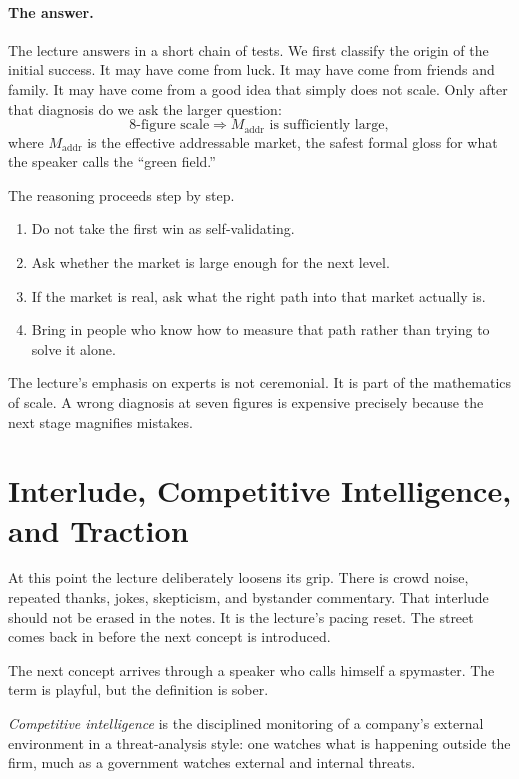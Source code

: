 \paragraph{The answer.}
The lecture answers in a short chain of tests. We first classify the origin of the initial success. It may have come from luck. It may have come from friends and family. It may have come from a good idea that simply does not scale. Only after that diagnosis do we ask the larger question:
\begin{equation}
\text{8-figure scale} \Rightarrow M_{\mathrm{addr}} \text{ is sufficiently large},
\end{equation}
where $M_{\mathrm{addr}}$ is the effective addressable market, the safest formal gloss for what the speaker calls the ``green field.''

The reasoning proceeds step by step.
\begin{enumerate}
\item Do not take the first win as self-validating.
\item Ask whether the market is large enough for the next level.
\item If the market is real, ask what the right path into that market actually is.
\item Bring in people who know how to measure that path rather than trying to solve it alone.
\end{enumerate}

The lecture's emphasis on experts is not ceremonial. It is part of the mathematics of scale. A wrong diagnosis at seven figures is expensive precisely because the next stage magnifies mistakes.

\section{Interlude, Competitive Intelligence, and Traction}

At this point the lecture deliberately loosens its grip. There is crowd noise, repeated thanks, jokes, skepticism, and bystander commentary. That interlude should not be erased in the notes. It is the lecture's pacing reset. The street comes back in before the next concept is introduced.

The next concept arrives through a speaker who calls himself a spymaster. The term is playful, but the definition is sober.

\begin{definition}
\emph{Competitive intelligence} is the disciplined monitoring of a company's external environment in a threat-analysis style: one watches what is happening outside the firm, much as a government watches external and internal threats.
\end{definition}

